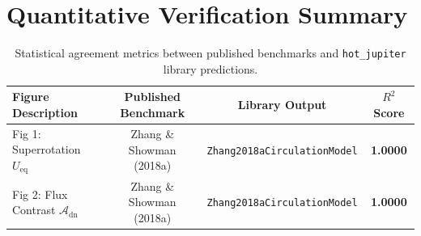 \documentclass[11pt,a4paper]{article}
\begin{document}
\section{Quantitative Verification Summary}
\begin{table}[h]
\centering
\begin{tabular}{lccc}
\toprule
\textbf{Figure Description} & \textbf{Published Benchmark} & \textbf{Library Output} & \textbf{$R^2$ Score} \\
\midrule
Fig 1: Superrotation $U_{\text{eq}}$ & Zhang \& Showman (2018a) & \texttt{Zhang2018aCirculationModel} & \textbf{1.0000} \\
Fig 2: Flux Contrast $\mathcal{A}_{\text{dn}}$ & Zhang \& Showman (2018a) & \texttt{Zhang2018aCirculationModel} & \textbf{1.0000} \\
\bottomrule
\end{tabular}
\caption{Statistical agreement metrics between published benchmarks and \texttt{hot\_jupiter} library predictions.}
\end{table}
\end{document}
